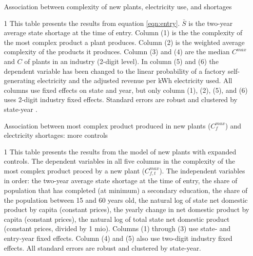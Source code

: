 \documentclass[11pt]{article}
\begin{document}
\begin{table}[H]
	\begin{center}
		\begin{threeparttable}
			\caption{Association between complexity of new plants, electricity use, and shortages}
			\label{tab:entry_min}
			
			\begin{tablenotes} \footnotesize 
			\item[1] This table presents the results from equation \ref{eqn:entry}. $\bar{S}$ is the two-year average state shortage at the time of entry. Column (1) is the the complexity of the most complex product a plant produces. Column (2) is the weighted average complexity of the products it produces. Column (3) and (4) are the median $C^{max}$ and $C$ of plants in an industry (2-digit level). In column (5) and (6) the dependent variable has been changed to the linear probability of a factory self-generating electricity and the adjusted revenue per kWh electricity used. All columns use fixed effects on state and year, but only column (1), (2), (5), and (6) uses 2-digit industry fixed effects. Standard errors are robust and clustered by state-year .
			\end{tablenotes}
		\end{threeparttable}
	\end{center}
\end{table}   


\begin{table}[H]
	\begin{center}
		\begin{threeparttable}
			\caption{Association between most complex product produced in new plants ($C^{max}_{f}$) and electricity shortages: more controls}
			\label{tab:entry_max_max}
			
			\begin{tablenotes} \footnotesize 
			\item[1] This table presents the results from the model of new plants with expanded controls. The dependent variables in all five columns in the complexity of the most complex product proced by a new plant ($C^{max}_{f,t}$). The independent variables in order: the two-year average state shortage at the time of entry, the share of population that has completed (at minimum) a secondary education, the share of the population between 15 and 60 years old, the natural log of state net domestic product by capita (constant prices), the yearly change in net domestic product by capita (constant prices), the natural log of total state net domestic product (constant prices, divided by 1 mio). Columns (1) through (3) use state- and entry-year fixed effects. Column (4) and (5) also use two-digit industry fixed effects. All standard errors are robust and clustered by state-year.
			\end{tablenotes}
		\end{threeparttable}
	\end{center}
\end{table}   
\end{document}

